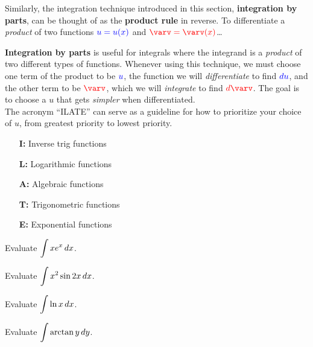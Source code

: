 \documentclass[12pt]{article}
\begin{document}
\vspace{3mm}

Similarly, the integration technique introduced in this section, \textbf{integration by parts}, can be thought of as the \textbf{product rule} in reverse. To differentiate a \textit{product} of two functions $\textcolor{blue}{u=u(x)}$ and $\textcolor{red}{\varv=\varv(x)}$\dots

\newpage


\vspace{5mm}

\textbf{Integration by parts }is useful for integrals where the integrand is a \textit{product} of two different types of functions. Whenever using this technique, we must choose one term of the product to be $\textcolor{blue}{u}$, the function we will \textit{differentiate} to find $\textcolor{blue}{du}$, and the other term to be $\textcolor{red}{\varv}$, which we will \textit{integrate} to find $\textcolor{red}{d\varv}$. The goal is to choose a $u$ that gets \textit{simpler} when differentiated. \\

The acronym ``ILATE'' can serve as a guideline for how to prioritize your choice of $u$, from greatest priority to lowest priority.
\begin{itemize}
	\item[\textbf{I:}] Inverse trig functions
	\item[\textbf{L:}] Logarithmic functions
	\item[\textbf{A:}] Algebraic functions
	\item[\textbf{T:}] Trigonometric functions
	\item[\textbf{E:}] Exponential functions
\end{itemize}

\vspace{3mm}

\Example Evaluate $\displaystyle\int xe^x\,dx$.

\newpage

\Example Evaluate $\displaystyle\int x^2\sin 2x\,dx$.

\vfill

\Example Evaluate $\displaystyle\int\ln x\,dx$.

\vfill

\Example Evaluate $\displaystyle\int\arctan y\,dy$.
\end{document}
